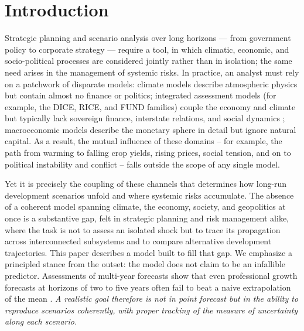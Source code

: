 \documentclass[a4paper,fleqn]{cas-sc}
\begin{document}
\section{Introduction}


Strategic planning and scenario analysis over long horizons --- from government policy to
corporate strategy --- require a tool, in which climatic, economic, and socio-political processes
are considered jointly rather than in isolation; the same need arises in the management of
systemic risks. In practice, an analyst must rely on a patchwork of disparate models: climate
models describe atmospheric physics but contain almost no finance or politics; integrated
assessment models (for example, the DICE, RICE, and FUND families) couple the economy and climate
but typically lack sovereign finance, interstate relations, and social dynamics \citep{nordhaus2017}; macroeconomic models describe the monetary sphere in detail but ignore natural capital. As a result, the mutual influence of these domains -- for example, the path from warming to falling crop yields, rising prices, social tension, and on to political instability and conflict -- falls outside the scope of any single model.

Yet it is precisely the coupling of these channels that determines how long-run development
scenarios unfold and where systemic risks accumulate. The absence of a coherent model spanning
climate, the economy, society, and geopolitics at once is a substantive gap, felt in strategic
planning and risk management alike, where the task is not to assess an isolated shock but to trace
its propagation across interconnected subsystems and to compare alternative development
trajectories. This paper describes a model built to fill that gap. We emphasize a principled stance
from the outset: the model does not claim to be an infallible predictor. Assessments of multi-year
forecasts show that even professional growth forecasts at horizons of two to five years often fail
to beat a naive extrapolation of the mean \citep{celasun2021}. {\it A realistic goal therefore is not
in point forecast but in the ability to reproduce scenarios coherently, with proper tracking of the measure of uncertainty along each scenario.}
\end{document}
